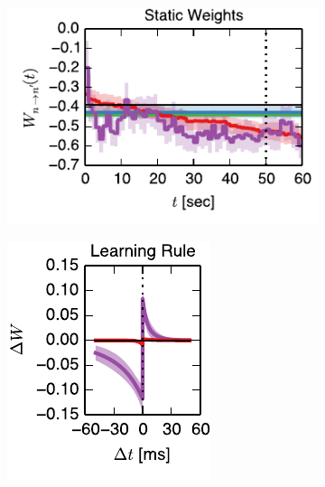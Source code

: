 \begin{figure}[t!]
  \centering
  \vspace{-0.5em}
  \begin{subfigure}[T]{2.4in}
    \includegraphics[width=\textwidth]{figures/ch4/fig3_static_trajectory}    
    \label{fig:fig3_static_trajectory}
  \end{subfigure}
  \begin{subfigure}[T]{1.45in}
    \includegraphics[width=\textwidth]{figures/ch4/fig3_static_stdp_rule}    

\end{subfigure}
\end{figure}

